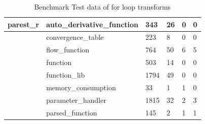 \documentclass[bsc,frontabs,singlespacing,twoside,parskip,deptreport]{infthesis}
\begin{document}
\begin{table}[H]
\begin{tabular}{|l|l|l|l|l|l|}
parest\_r & auto\_derivative\_function & 343 & 26 & 0 & 0 \\ \hline
 & convergence\_table & 223 & 8 & 0 & 0 \\ \hline
 & flow\_function & 764 & 50 & 6 & 5 \\ \hline
 & function & 503 & 14 & 0 & 0 \\ \hline
 & function\_lib & 1794 & 49 & 0 & 0 \\ \hline
 & memory\_consumption & 33 & 1 & 1 & 0 \\ \hline
 & parameter\_handler & 1815 & 32 & 2 & 3 \\ \hline
 & parsed\_function & 145 & 2 & 1 & 1 \\ \hline
\end{tabular}
\caption{Benchmark Test data of for loop transforms }
\label{tab:for-tool-benchmark}
\end{table}
\end{document}
